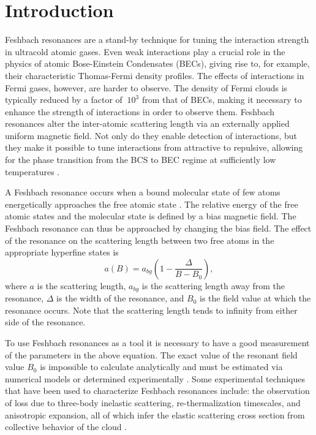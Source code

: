 \documentclass[12pt]{iopart}
\begin{document}
\section{Introduction}
Feshbach resonances are a stand-by technique for tuning the interaction strength in ultracold atomic gases. Even weak interactions play a crucial role in the physics of atomic Bose-Einstein Condensates (BECs), giving rise to, for example, their characteristic Thomas-Fermi density profiles. The effects of interactions in Fermi gases, however, are harder to observe. The density of Fermi clouds is typically reduced by a factor of $~10^3$ from that of BECs, making it necessary to enhance the strength of interactions in order to observe them. Feshbach resonances alter the inter-atomic scattering length via an externally applied uniform magnetic field. Not only do they enable detection of interactions, but they make it possible to tune interactions from attractive to repulsive, allowing for the phase transition from the BCS to BEC regime at sufficiently low temperatures \cite{RegalThesis, Regal04}. 
\par A Feshbach resonance occurs when a bound molecular state of few atoms energetically approaches the free atomic state \cite{Chin10, Timmermans99}. The relative energy of the free atomic states and the molecular state is defined by a bias magnetic field. The Feshbach resonance can thus be approached by changing the bias field. The effect of the resonance on the scattering length between two free atoms in the appropriate hyperfine states is
\begin{equation}
a(B)=a_{bg}\left(1-\frac{\Delta}{B-B_0}\right),
\label{feshbachEq}
\end{equation}
where $a$ is the scattering length, $a_{bg}$ is the scattering length away from the resonance, $\Delta$ is the width of the resonance, and $B_0$ is the field value at which the resonance occurs. Note that the scattering length tends to infinity from either side of the resonance.
\par To use Feshbach resonances as a tool it  is necessary to have a good measurement of the parameters in the above equation.  The exact value of the resonant field value $B_0$ is impossible to calculate analytically and must be estimated via numerical models \cite{Tiesinga93, Lysebo09, Gao11} or determined experimentally \cite{Inouye98, Cornish00}. Some experimental techniques that have been used to characterize Feshbach resonances include: the observation of loss due to three-body inelastic scattering, re-thermalization timescales, and anisotropic expansion, all of which infer the elastic scattering cross section from collective behavior of the cloud \cite{Regal03,OHara02,Monroe93}. 
\end{document}
